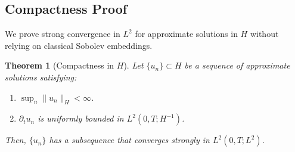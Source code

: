 \documentclass[12pt]{article}
\newtheorem{theorem}{Theorem}[section]
\theoremstyle{definition}
\begin{document}
\subsection{Compactness Proof}
We prove strong convergence in $L^2$ for approximate solutions in $H$ without relying on classical Sobolev embeddings.

\begin{theorem}[Compactness in $H$]
Let $\{u_n\} \subset H$ be a sequence of approximate solutions satisfying:
\begin{enumerate}
    \item $\sup_n \|u_n\|_H < \infty$.
    \item $\partial_t u_n$ is uniformly bounded in $L^2(0, T; H^{-1})$.
\end{enumerate}
Then, $\{u_n\}$ has a subsequence that converges strongly in $L^2(0, T; L^2)$.
\end{theorem}
\end{document}
